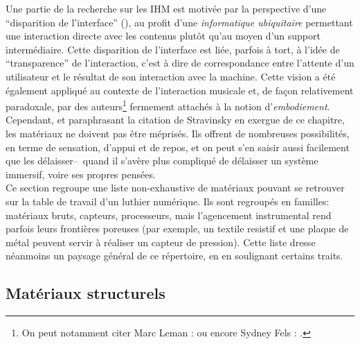 \noindent Une partie de la recherche sur les \gls{IHM} est motivée par la perspective d'une ``disparition de l'interface'' (\cite{weiser_computer_1991, dey_distributed_2001, hui_towards_2017}), au profit d'une \textit{informatique ubiquitaire} permettant une interaction directe avec les contenus plutôt qu'au moyen d'un support intermédiaire. Cette disparition de l'interface est liée, parfois à tort, à l'idée de ``transparence'' de l'interaction, c'est à dire de correspondance entre l'attente d'un utilisateur et le résultat de son interaction avec la machine. Cette vision a été également appliqué au contexte de l'interaction musicale et, de façon relativement paradoxale, par des auteurs\footnote{On peut notamment citer Marc Leman : \cite{leman_embodied_2008} ou encore Sydney Fels :  \cite{fels_mapping_2002}.} fermement attachés à la notion d'\textit{embodiement}.\\
\indent Cependant, et paraphrasant la citation de Stravinsky en exergue de ce chapitre, les matériaux ne doivent pas être méprisés. Ils offrent de nombreuses possibilités, en terme de sensation, d'appui et de repos, et on peut s'en saisir aussi facilement que les délaisser--~quand il s'avère plus compliqué de délaisser un système immersif, voire ses propres pensées.\\
\indent Ce section regroupe une liste non-exhaustive de matériaux pouvant se retrouver sur la table de travail d'un luthier numérique. Ils sont regroupés en familles: matériaux bruts, capteurs, processeurs, mais l'agencement instrumental rend parfois leurs frontières poreuses (par exemple, un textile resistif et une plaque de métal peuvent servir à réaliser un capteur de pression). Cette liste dresse néanmoins un paysage général de ce répertoire, en en soulignant certains traits.

\subsection{Matériaux structurels}

